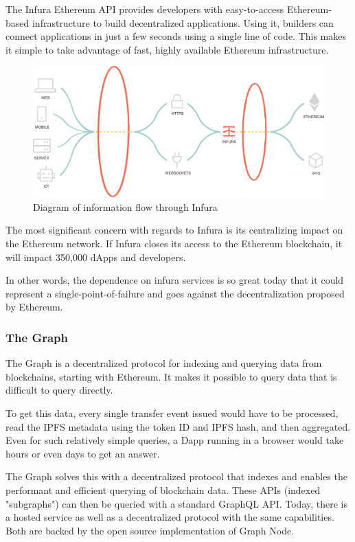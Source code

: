 \documentclass[MSE,Master,english]{twbook}%
\begin{document}
The Infura Ethereum API provides developers with easy-to-access Ethereum-based infrastructure to build decentralized applications. Using it, builders can connect applications in just a few seconds using a single line of code. This makes it simple to take advantage of fast, highly available Ethereum infrastructure.\cite{infura}

\begin{figure}[H]
  \centering
  \includegraphics[width=\textwidth]{infura.png}
  \caption{Diagram of information flow through Infura \cite{infura}}
  \label{fig:infura}
\end{figure}

The most significant concern\cite{infuraCons} with regards to Infura is its centralizing impact on the Ethereum network. If Infura closes its access to the Ethereum blockchain, it will impact 350,000 dApps and developers.\cite{infuraUsers}

In other words, the dependence on infura services is so great today that it could represent a single-point-of-failure and goes against the decentralization proposed by Ethereum.

\subsubsection{The Graph}
The Graph\cite{thegraph} is a decentralized protocol for indexing and querying data from blockchains, starting with Ethereum. It makes it possible to query data that is difficult to query directly.

To get this data, every single transfer event issued would have to be processed, read the \ac{IPFS}\cite{ipfs} metadata using the token ID and \ac{IPFS} hash, and then aggregated. Even for such relatively simple queries, a \ac{Dapp} running in a browser would take hours or even days to get an answer.\cite{thegraph}

The Graph solves this with a decentralized protocol that indexes and enables the performant and efficient querying of blockchain data. These APIs (indexed "subgraphs") can then be queried with a standard GraphQL API. Today, there is a hosted service as well as a decentralized protocol with the same capabilities. Both are backed by the open source implementation of Graph Node.\cite{thegraph}
\end{document}
